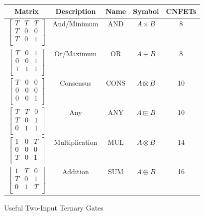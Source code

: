 \documentclass[12pt]{article}
\begin{document}
\begin{figure}[h]
    \centering
    \begin{tabular}{c|c|c|c|c}
        Matrix & Description & Name & Symbol & CNFETs \\
        \hline
        $\begin{bmatrix}T & T & T \\ T & 0 & 0 \\ T & 0 & 1 \\\end{bmatrix}$ & And/Minimum & AND & $A \times B$ & 8 \\
        $\begin{bmatrix}T & 0 & 1 \\ 0 & 0 & 1 \\ 1 & 1 & 1 \\\end{bmatrix}$ & Or/Maximum & OR & $A + B$ & 8 \\
        $\begin{bmatrix}T & 0 & 0 \\ 0 & 0 & 0 \\ 0 & 0 & 1 \\\end{bmatrix}$ & Consensus & CONS & $A \boxtimes B$ & 10 \\
        $\begin{bmatrix}T & T & 0 \\ T & 0 & 1 \\ 0 & 1 & 1 \\\end{bmatrix}$ & Any & ANY & $A \boxplus B$ & 10 \\
        $\begin{bmatrix}1 & 0 & T \\ 0 & 0 & 0 \\ T & 0 & 1 \\\end{bmatrix}$ & Multiplication & MUL & $A \otimes B$ & 14 \\
        $\begin{bmatrix}1 & T & 0 \\ T & 0 & 1 \\ 0 & 1 & T \\\end{bmatrix}$ & Addition & SUM & $A \oplus B$ & 16 \\
    \end{tabular}
    \caption{Useful Two-Input Ternary Gates}
    \label{fig:two_value_ter_gates}
\end{figure}
\end{document}
